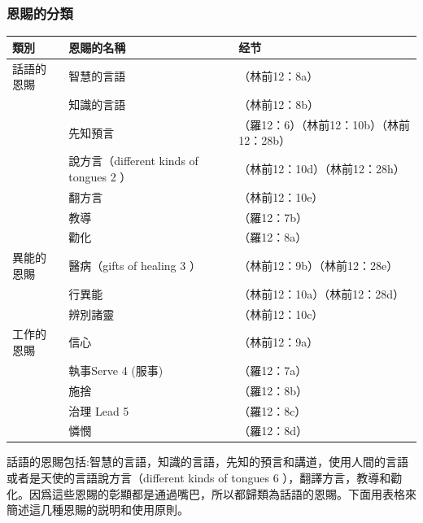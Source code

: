 \subsubsection{恩賜的分類}

\begin{table}[htbp]
\centering
\begin{tabular}{p{6.145em}|p{17.785em}|p{21.5em}}\toprule
 \multicolumn{1}{p{6.215em}|}{\textbf{類別}} & \multicolumn{1}{p{5.215em}|}{\textbf{恩賜的名稱}} & \textbf{经节} \\\midrule
話語的恩賜& 智慧的言語&（林前12：8a）\\\midrule
&知識的言語&（林前12：8b）\\\midrule
&先知預言&（羅12：6）（林前12：10b）（林前12：28b）\\\midrule
&說方言（different kinds of tongues 2 ）&（林前12：10d）（林前12：28h）\\\midrule
&翻方言&（林前12：10e）\\\midrule
&教導&（羅12：7b）\\\midrule
&勸化&（羅12：8a）\\\midrule

異能的恩賜& 醫病（gifts of healing 3 ）&（林前12：9b）（林前12：28e）\\\midrule

&行異能&（林前12：10a）（林前12：28d）\\\midrule
&辨別諸靈&（林前12：10c）\\\midrule
工作的恩賜 &信心&（林前12：9a）\\\midrule

&執事Serve 4 (服事)&（羅12：7a）\\\midrule
&施捨&（羅12：8b）\\\midrule
&治理 Lead 5 &（羅12：8c）\\\midrule
&憐憫&（羅12：8d）\\\midrule
\end{tabular}%
\end{table}%

話語的恩賜包括:智慧的言語，知識的言語，先知的預言和講道，使用人間的言語或者是天使的言語說方言（different kinds of tongues 6 ），翻譯方言，教導和勸化。因爲這些恩賜的彰顯都是通過嘴巴，所以都歸類為話語的恩賜。下面用表格來簡述這几種恩賜的説明和使用原則。

